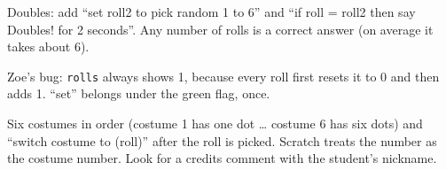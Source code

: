 \begin{answer}
Doubles: add \enquote{set roll2 to pick random 1 to 6} and \enquote{if roll = roll2 then say Doubles! for 2 seconds}. Any number of rolls is a correct answer (on average it takes about 6).

Zoe's bug: \texttt{rolls} always shows 1, because every roll first resets it to 0 and then adds 1. \enquote{set} belongs under the green flag, once.
\end{answer}

\begin{answer}
Six costumes in order (costume 1 has one dot \ldots{} costume 6 has six dots) and \enquote{switch costume to (roll)} after the roll is picked. Scratch treats the number as the costume number. Look for a credits comment with the student's nickname.
\end{answer}
